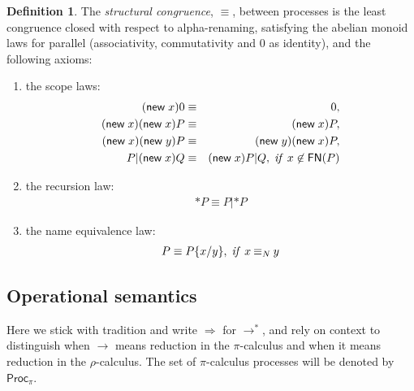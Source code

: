 \documentclass[submission,copyright,creativecommons]{eptcs}
\newcommand{\pic}{$\pi$-calculus}
\newcommand{\pzero}{\mathbin{0}}
\newcommand{\scong}{\mathbin{\equiv}}
\newcommand{\nameeq}{\mathbin{\equiv_N}}
\newcommand{\freenames}[1]{\mathbin{\mathsf{FN}(#1)}}
\newcommand{\substn}[2]{\{ #1 / #2 \}}
\newcommand{\Proc}{\mathsf{Proc}}
\newcommand{\red}{\rightarrow}
\newcommand{\wred}{\Rightarrow}
\newcommand{\rhoc}{$\rho$-calculus}
\theoremstyle{definition}
\newtheorem{definition}{Definition}
\theoremstyle{remark}
\theoremstyle{remark}
\begin{document}
\begin{definition}
The {\em structural congruence}, $\equiv$, between processes is 
the least congruence closed with respect to
alpha-renaming, satisfying the abelian monoid laws for 
parallel (associativity, commutativity and $\pzero$ 
as identity), and the following axioms:
\begin{enumerate}
\item the scope laws:
\begin{eqnarray*}
 (\mathsf{new}\;x)\pzero & \equiv & \pzero, \\
 (\mathsf{new}\;x)(\mathsf{new}\;x)P & \equiv & (\mathsf{new}\;x)P, \\
 (\mathsf{new}\;x)(\mathsf{new}\;y)P & \equiv & (\mathsf{new}\;y)(\mathsf{new}\;x)P, \\
 P|(\mathsf{new}\;x)Q & \equiv & (\mathsf{new}\;x)P|Q, \; \mbox{\textit{if} }x \not\in \freenames{P} 
\end{eqnarray*}
\item
the recursion law:
\begin{eqnarray*}
 \mathsf{*}P \equiv P|\mathsf{*}P
\end{eqnarray*}
\item
the name equivalence law:
\begin{eqnarray*}
 P \equiv P \substn{x}{y}, \; \mbox{\textit{if} }x \nameeq y
\end{eqnarray*}
\end{enumerate}
\end{definition}

\subsection{Operational semantics} 



Here we stick with tradition and write $\wred$ for $\red^*$, and rely
on context to distinguish when $\red$ means reduction in the {\pic}
and when it means reduction in the {\rhoc}. The set of {\pic}
processes will be denoted by $\Proc_{\pi}$.
\end{document}
